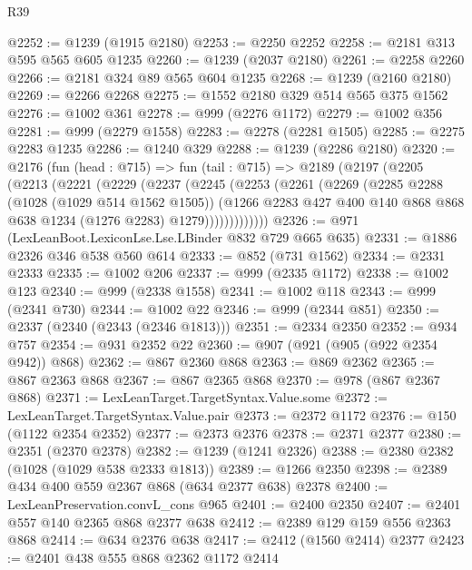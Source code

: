 \begin{lexlean}{R39}
\begin{coremodule}
@2252 := @1239 (@1915 @2180)
@2253 := @2250 @2252
@2258 := @2181 @313 @595 @565 @605 @1235
@2260 := @1239 (@2037 @2180)
@2261 := @2258 @2260
@2266 := @2181 @324 @89 @565 @604 @1235
@2268 := @1239 (@2160 @2180)
@2269 := @2266 @2268
@2275 := @1552 @2180 @329 @514 @565 @375 @1562
@2276 := @1002 @361
@2278 := @999 (@2276 @1172)
@2279 := @1002 @356
@2281 := @999 (@2279 @1558)
@2283 := @2278 (@2281 @1505)
@2285 := @2275 @2283 @1235
@2286 := @1240 @329
@2288 := @1239 (@2286 @2180)
@2320 := @2176
    (fun (head : @715) =>
    fun (tail : @715) =>
    @2189
      (@2197
        (@2205
          (@2213
            (@2221
              (@2229
                (@2237
                  (@2245
                    (@2253
                      (@2261
                        (@2269
                          (@2285
                            @2288
                            (@1028 (@1029 @514 @1562 @1505))
                            (@1266
                              @2283
                              @427
                              @400
                              @140
                              @868
                              @868
                              @638
                              @1234
                              (@1276 @2283)
                              @1279)))))))))))))
@2326 := @971 (LexLeanBoot.LexiconLse.Lse.LBinder @832 @729 @665 @635)
@2331 := @1886 @2326 @346 @538 @560 @614
@2333 := @852 (@731 @1562)
@2334 := @2331 @2333
@2335 := @1002 @206
@2337 := @999 (@2335 @1172)
@2338 := @1002 @123
@2340 := @999 (@2338 @1558)
@2341 := @1002 @118
@2343 := @999 (@2341 @730)
@2344 := @1002 @22
@2346 := @999 (@2344 @851)
@2350 := @2337 (@2340 (@2343 (@2346 @1813)))
@2351 := @2334 @2350
@2352 := @934 @757
@2354 := @931 @2352 @22
@2360 := @907 (@921 (@905 (@922 @2354 @942)) @868)
@2362 := @867 @2360 @868
@2363 := @869 @2362
@2365 := @867 @2363 @868
@2367 := @867 @2365 @868
@2370 := @978 (@867 @2367 @868)
@2371 := LexLeanTarget.TargetSyntax.Value.some
@2372 := LexLeanTarget.TargetSyntax.Value.pair
@2373 := @2372 @1172
@2376 := @150 (@1122 @2354 @2352)
@2377 := @2373 @2376
@2378 := @2371 @2377
@2380 := @2351 (@2370 @2378)
@2382 := @1239 (@1241 @2326)
@2388 := @2380 @2382 (@1028 (@1029 @538 @2333 @1813))
@2389 := @1266 @2350
@2398 := @2389 @434 @400 @559 @2367 @868 (@634 @2377 @638) @2378
@2400 := LexLeanPreservation.convL_cons @965
@2401 := @2400 @2350
@2407 := @2401 @557 @140 @2365 @868 @2377 @638
@2412 := @2389 @129 @159 @556 @2363 @868
@2414 := @634 @2376 @638
@2417 := @2412 (@1560 @2414) @2377
@2423 := @2401 @438 @555 @868 @2362 @1172 @2414

\end{coremodule}
\end{lexlean}

